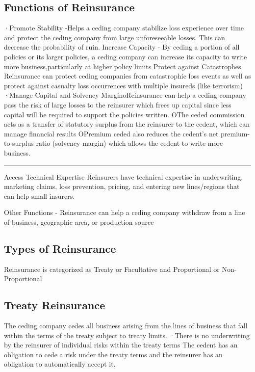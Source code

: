 \documentclass[
]{article}
\begin{document}
\subsection{Functions of Reinsurance}\label{functions-of-reinsurance}

·Promote Stability -Helps a ceding company stabilize loss experience
over time and protect the ceding company from large unforeseeable
losses. This can decrease the probability of ruin. Increase Capacity -
By ceding a portion of all policies or its larger policies, a ceding
company can increase its capacity to write more business,particularly at
higher policy limits Protect against Catastrophes Reinsurance can
protect ceding companies from catastrophic loss events as well as
protect against casualty loss occurrences with multiple insureds (like
terrorism) ·Manage Capital and Solvency MarginoReinsurance can help a
ceding company pass the risk of large losses to the reinsurer which
frees up capital since less capital will be required to support the
policies written. OThe ceded commission acts as a transfer of statutory
surplus from the reinsurer to the cedent, which can manage financial
results OPremium ceded also reduces the cedent's net premium-to-surplus
ratio (solvency margin) which allows the cedent to write more business.

\begin{center}\rule{0.5\linewidth}{0.5pt}\end{center}

Access Technical Expertise Reinsurers have technical expertise in
underwriting, marketing claims, loss prevention, pricing, and entering
new lines/regions that can help small insurers.

Other Functions - Reinsurance can help a ceding company withdraw from a
line of business, geographic area, or production source

\subsection{Types of Reinsurance}\label{types-of-reinsurance}

Reinsurance is categorized as Treaty or Facultative and Proportional or
Non-Proportional

\subsection{Treaty Reinsurance}\label{treaty-reinsurance}

The ceding company cedes all business arising from the lines of business
that fall within the terms of the treaty subject to treaty limits.
·There is no underwriting by the reinsurer of individual risks within
the treaty terms The cedent has an obligation to cede a risk under the
treaty terms and the reinsurer has an obligation to automatically accept
it.
\end{document}
